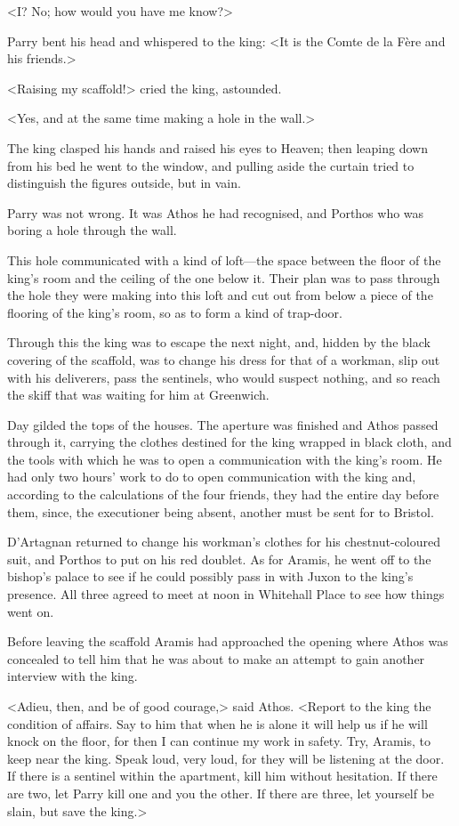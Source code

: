 <I\@? No; how would you have me know?>

Parry bent his head and whispered to the king: <It is the Comte de la Fère and his friends.>

<Raising my scaffold!> cried the king, astounded.

<Yes, and at the same time making a hole in the wall.>

The king clasped his hands and raised his eyes to Heaven; then leaping down from his bed he went to the window, and pulling aside the curtain tried to distinguish the figures outside, but in vain.

Parry was not wrong. It was Athos he had recognised, and Porthos who was boring a hole through the wall.

This hole communicated with a kind of loft—the space between the floor of the king's room and the ceiling of the one below it. Their plan was to pass through the hole they were making into this loft and cut out from below a piece of the flooring of the king's room, so as to form a kind of trap-door.

Through this the king was to escape the next night, and, hidden by the black covering of the scaffold, was to change his dress for that of a workman, slip out with his deliverers, pass the sentinels, who would suspect nothing, and so reach the skiff that was waiting for him at Greenwich.

Day gilded the tops of the houses. The aperture was finished and Athos passed through it, carrying the clothes destined for the king wrapped in black cloth, and the tools with which he was to open a communication with the king's room. He had only two hours' work to do to open communication with the king and, according to the calculations of the four friends, they had the entire day before them, since, the executioner being absent, another must be sent for to Bristol.

D'Artagnan returned to change his workman's clothes for his chestnut-coloured suit, and Porthos to put on his red doublet. As for Aramis, he went off to the bishop's palace to see if he could possibly pass in with Juxon to the king's presence. All three agreed to meet at noon in Whitehall Place to see how things went on.

Before leaving the scaffold Aramis had approached the opening where Athos was concealed to tell him that he was about to make an attempt to gain another interview with the king.

<Adieu, then, and be of good courage,> said Athos. <Report to the king the condition of affairs. Say to him that when he is alone it will help us if he will knock on the floor, for then I can continue my work in safety. Try, Aramis, to keep near the king. Speak loud, very loud, for they will be listening at the door. If there is a sentinel within the apartment, kill him without hesitation. If there are two, let Parry kill one and you the other. If there are three, let yourself be slain, but save the king.>

